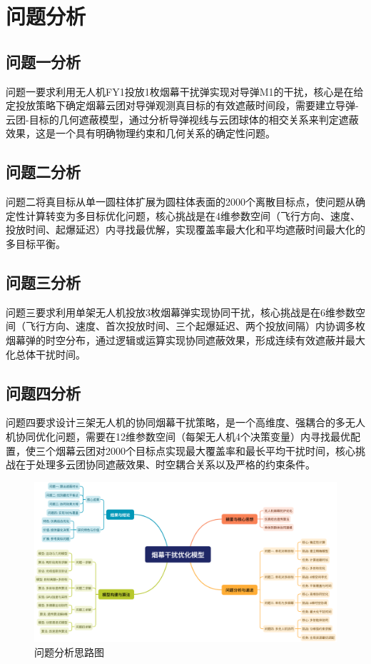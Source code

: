 \section{问题分析}

\subsection{问题一分析}

问题一要求利用无人机FY1投放1枚烟幕干扰弹实现对导弹M1的干扰，核心是在给定投放策略下确定烟幕云团对导弹观测真目标的有效遮蔽时间段，需要建立导弹-云团-目标的几何遮蔽模型，通过分析导弹视线与云团球体的相交关系来判定遮蔽效果，这是一个具有明确物理约束和几何关系的确定性问题。

\subsection{问题二分析}

问题二将真目标从单一圆柱体扩展为圆柱体表面的2000个离散目标点，使问题从确定性计算转变为多目标优化问题，核心挑战是在4维参数空间（飞行方向、速度、投放时间、起爆延迟）内寻找最优解，实现覆盖率最大化和平均遮蔽时间最大化的多目标平衡。

\subsection{问题三分析}

问题三要求利用单架无人机投放3枚烟幕弹实现协同干扰，核心挑战是在6维参数空间（飞行方向、速度、首次投放时间、三个起爆延迟、两个投放间隔）内协调多枚烟幕弹的时空分布，通过逻辑或运算实现协同遮蔽效果，形成连续有效遮蔽并最大化总体干扰时间。

\subsection{问题四分析}

问题四要求设计三架无人机的协同烟幕干扰策略，是一个高维度、强耦合的多无人机协同优化问题，需要在12维参数空间（每架无人机4个决策变量）内寻找最优配置，使三个烟幕云团对2000个目标点实现最大覆盖率和最长平均干扰时间，核心挑战在于处理多云团协同遮蔽效果、时空耦合关系以及严格的约束条件。

\begin{figure}[htbp]
\centering
\includegraphics[width=\textwidth]{figures/分析思路.png}
\caption{问题分析思路图}
\label{fig:analysis_approach}
\end{figure}

